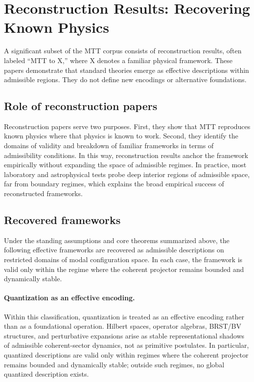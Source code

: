 \documentclass[11pt]{article}
\begin{document}
\section{Reconstruction Results: Recovering Known Physics}

A significant subset of the MTT corpus consists of reconstruction results, often labeled “MTT to X,” where X denotes a familiar physical framework. These papers demonstrate that standard theories emerge as effective descriptions within admissible regions. They do not define new encodings or alternative foundations.

\subsection{Role of reconstruction papers}

Reconstruction papers serve two purposes. First, they show that MTT reproduces known physics where that physics is known to work. Second, they identify the domains of validity and breakdown of familiar frameworks in terms of admissibility conditions. In this way, reconstruction results anchor the framework empirically without expanding the space of admissible regimes.
In practice, most laboratory and astrophysical tests probe deep interior regions of admissible space,
far from boundary regimes, which explains the broad empirical success of reconstructed frameworks.


\subsection{Recovered frameworks}

Under the standing assumptions and core theorems summarized above, the following effective
frameworks are recovered as admissible descriptions on restricted domains of modal
configuration space. In each case, the framework is valid only within the regime where the
coherent projector remains bounded and dynamically stable.
\paragraph{Quantization as an effective encoding.}
Within this classification, quantization is treated as an effective encoding rather than as a
foundational operation. Hilbert spaces, operator algebras, BRST/BV structures, and perturbative
expansions arise as stable representational shadows of admissible coherent-sector dynamics, not
as primitive postulates. In particular, quantized descriptions are valid only within regimes where
the coherent projector remains bounded and dynamically stable; outside such regimes, no global
quantized description exists.
\end{document}
